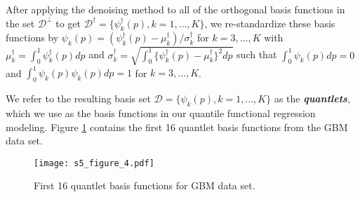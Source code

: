 \documentclass[11pt]{article}
\begin{document}
  After applying the denoising method to all of the orthogonal basis functions in the set $\mathcal{D}^{\perp}$ to get $\mathcal{D}^\dagger=\{\psi^\dagger_k(p), k=1,\ldots,K\}$, we re-standardize these basis functions  by $\psi_k(p)=(\psi_k^{\dagger}(p) - \mu^\dagger_k)/\sigma^\dagger_k$ for $k=3, \ldots, K$ with $\mu^\dagger_k = \int_0^1 \psi_k^{\dagger}(p) dp$ and $\sigma^\dagger_k=\sqrt{\int_0^1 \{\psi_k^{\dagger}(p)-\mu^\dagger_k\}^2  dp}$ such that $\int_0^1 \psi_k(p) dp=0$ and $\int_0^1 \psi_k(p) \psi_k(p) dp = 1$ for $k=3,\ldots,K$.  

We refer to the resulting basis set $\mathcal{D}=\{\psi_k(p), k=1,\ldots, K\}$ as the \textbf{{\it quantlets}}, which we use as the basis functions in our quantile functional regression modeling.     Figure \ref{S5_QBE} contains the first 16 quantlet basis functions from the GBM data set.

   \begin{figure}[!htb]
\centering
\caption{First 16 quantlet basis functions for GBM data set.
  \label{S5_QBE}}
\texttt{[image: s5\_figure\_4.pdf]}
\vspace{0.5cm} 
\end{figure}
\end{document}
